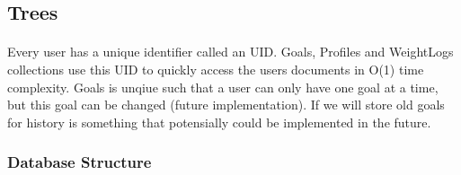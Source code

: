 \documentclass{article}
\begin{document}
    \hfill \break
    \hfill \break
    
    \subsection{Trees}
        \paragraph{}
        Every user has a unique identifier called an UID. Goals, Profiles and WeightLogs collections use this UID to quickly access the users documents in O(1) time complexity.
        Goals is unqiue such that a user can only have one goal at a time, but this goal can be changed (future implementation). If we will store old goals for history
        is something that potensially could be implemented in the future.

        \hfill \break
        \subsubsection{Database Structure}
\end{document}

